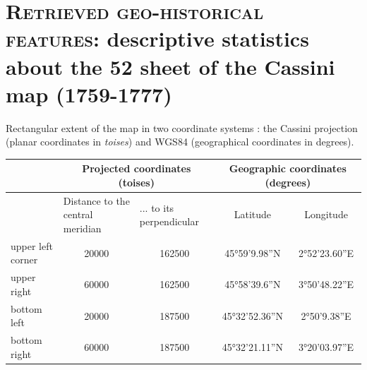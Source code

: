 \documentclass[portrait,a0]{sciposter}
\begin{document}
\vspace{-1cm}
\begin{minipage}[b]{\textwidth}
  \section{\normalfont \textsc{Retrieved geo-historical features}: descriptive statistics about the 52 sheet of the Cassini map (1759-1777)}
  \begin{multicols}{3}
    \setlength{\columnsep}{80pt}
    \footnotesize
    \begin{center}
      \captionsetup{type=table}
      \caption{Rectangular extent of the map in two coordinate systems : the Cassini projection (planar coordinates in \emph{toises}) and WGS84 (geographical coordinates in degrees).}
      \label{table:translation}
      \begin{tabular}{@{}lcccc@{}}
        \toprule
        & \multicolumn{2}{c}{Projected coordinates (toises)}                                                & \multicolumn{2}{c}{Geographic coordinates (degrees)}              \\
        \midrule
        & \multicolumn{1}{l}{Distance to the central meridian} & \multicolumn{1}{l}{... to its perpendicular} & \multicolumn{1}{c}{Latitude} & \multicolumn{1}{c}{Longitude} \\
        upper left corner & \num{20000}                                          & \num{162500}                                 & 45°59'9.98''N                & 2°52'23.60''E                 \\
        upper right       & \num{60000}                                          & \num{162500}                                 & 45°58'39.6''N                & 3°50'48.22''E                 \\
        bottom left      & \num{20000}                                        & \num{187500}                                & 45°32'52.36''N               & 2°50'9.38''E                  \\
        bottom right     & \num{60000}                                          & \num{187500}                                & 45°32'21.11''N               & 3°20'03.97''E                 \\
        \bottomrule
      \end{tabular}
    \end{center}
    \vfill    
    
    

\end{multicols}
\end{minipage}
\end{document}
